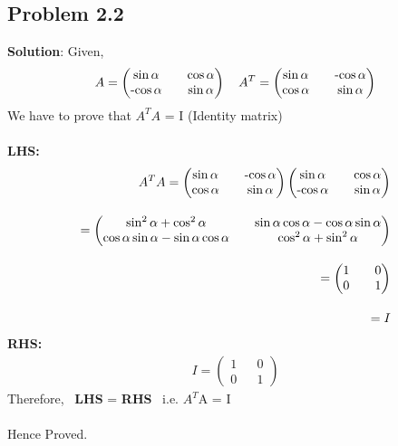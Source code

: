 \documentclass{article}
\newcommand{\myvec}[1]{\ensuremath{\begin{pmatrix}#1\end{pmatrix}}}
\begin{document}
\subsection*{Problem 2.2}
\textbf{Solution}:
Given,
\begin{align}
A = \myvec{\sin{\alpha} && \cos{\alpha} \\ $-$\cos{\alpha} && \sin{\alpha}} \quad
A^T = \myvec{\sin{\alpha} && $-$\cos{\alpha} \\ \cos{\alpha} && \sin{\alpha}}
\end{align}
We have to prove that $A^TA$ = I (Identity matrix) \\\\
\textbf{LHS:}\quad
\begin{align}
A^TA = \myvec{\sin{\alpha} && $-$\cos{\alpha} \\ \cos{\alpha} && \sin{\alpha}} \myvec{\sin{\alpha} && \cos{\alpha} \\ $-$\cos{\alpha} && \sin{\alpha}}\\[1em]
= \myvec{\sin^2{\alpha}+\cos^2{\alpha} && \sin{\alpha}\cos{\alpha}- \cos{\alpha}\sin{\alpha} \\ \cos{\alpha}\sin{\alpha}-\sin{\alpha}\cos{\alpha} && \cos^2{\alpha}+\sin^2{\alpha}}\\[1em]
= \myvec{1 && 0\\0 && 1} \\[1em]
= I
\end{align}
\textbf{RHS:}\quad
\begin{align}
I = \myvec{1 && 0\\0 && 1}
\end{align}
Therefore, \ \textbf{LHS} = \textbf{RHS} \ i.e. $A^T$A = I \\\\
Hence Proved.
\end{document}
